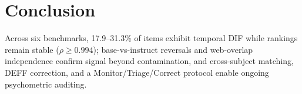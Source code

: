 \section{Conclusion}
\label{sec:conclusion}

Across six benchmarks, 17.9--31.3\% of items exhibit temporal DIF while rankings remain stable ($\rho \geq 0.994$); base-vs-instruct reversals and web-overlap independence confirm signal beyond contamination, and cross-subject matching, DEFF correction, and a Monitor/Triage/Correct protocol enable ongoing psychometric auditing.
